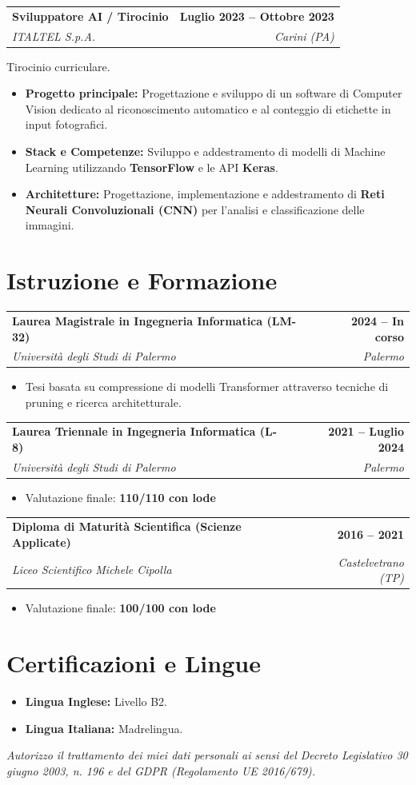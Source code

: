 \documentclass[11pt, a4paper]{article}
\makeatletter
\newcommand{\resumeItem}[4]{
  \vspace{1.5mm}
  \noindent
  \begin{tabular*}{\textwidth}{@{}l@{\extracolsep{\fill}}r@{}}
    \textbf{#1} & \textbf{\textcolor{primary}{#2}} \\
    \textit{#3} & \textit{#4} \\
  \end{tabular*}
  \vspace{1mm}
}
\makeatother
\begin{document}
\resumeItem{Sviluppatore AI / Tirocinio}{Luglio 2023 -- Ottobre 2023}{ITALTEL S.p.A.}{Carini (PA)}
Tirocinio curriculare.
\begin{itemize}
    \item \textbf{Progetto principale:} Progettazione e sviluppo di un software di Computer Vision dedicato al riconoscimento automatico e al conteggio di etichette in input fotografici.
    \item \textbf{Stack e Competenze:} Sviluppo e addestramento di modelli di Machine Learning utilizzando \textbf{TensorFlow} e le API \textbf{Keras}.
    \item \textbf{Architetture:} Progettazione, implementazione e addestramento di \textbf{Reti Neurali Convoluzionali (CNN)} per l'analisi e classificazione delle immagini.
\end{itemize}

\section{Istruzione e Formazione}

\resumeItem{Laurea Magistrale in Ingegneria Informatica (LM-32)}{2024 -- In corso}{Università degli Studi di Palermo}{Palermo}
\vspace{-1.5em}
\begin{itemize}
    \item Tesi basata su compressione di modelli Transformer attraverso tecniche di pruning e ricerca architetturale.
\end{itemize}

\resumeItem{Laurea Triennale in Ingegneria Informatica (L-8)}{2021 -- Luglio 2024}{Università degli Studi di Palermo}{Palermo}
\vspace{-1.5em}
\begin{itemize}
    \item Valutazione finale: \textbf{110/110 con lode}
\end{itemize}

\resumeItem{Diploma di Maturità Scientifica (Scienze Applicate)}{2016 -- 2021}{Liceo Scientifico Michele Cipolla}{Castelvetrano (TP)}
\vspace{-1.5em}
\begin{itemize}
    \item Valutazione finale: \textbf{100/100 con lode}
\end{itemize}

\section{Certificazioni e Lingue}
\begin{itemize}
    \item \textbf{Lingua Inglese:} Livello B2.
    \item \textbf{Lingua Italiana:} Madrelingua.
\end{itemize}

\vfill
\begin{center}
\scriptsize{\textit{Autorizzo il trattamento dei miei dati personali ai sensi del Decreto Legislativo 30 giugno 2003, n. 196 e del GDPR (Regolamento UE 2016/679).}}
\end{center}
\end{document}
